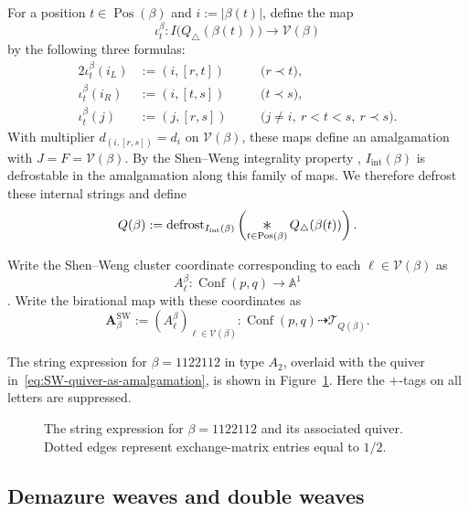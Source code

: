 \documentclass[10pt,a4paper]{article}
\theoremstyle{definition}
\theoremstyle{remark}
\newcommand{\Conf}{\operatorname{Conf}}
\newcommand{\Tcal}{\mathcal T}
\newcommand{\Vcal}{\mathcal V}
\newcommand{\bigast}{\mathop{\vcenter{\hbox{\Large\(\ast\)}}}\displaylimits}
\begin{document}
For a position \(t\in\operatorname{Pos}(\beta)\) and \(i:=|\beta(t)|\), define
the map
\[
 \iota_t^\beta:
 I\bigl(Q_\triangle(\beta(t))\bigr)
 \longrightarrow\Vcal(\beta)
\]
by the following three formulas:
\begin{alignat}{2}
 \iota_t^\beta(i_L)
 &:=(i,[r,t])
 &\quad&\bigl(r\mathrel{\prec}t\bigr),
 \label{eq:SW-basic-map-left}\\
 \iota_t^\beta(i_R)
 &:=(i,[t,s])
 &\quad&\bigl(t\mathrel{\prec}s\bigr),
 \label{eq:SW-basic-map-right}\\
 \iota_t^\beta(j)
 &:=(j,[r,s])
 &\quad&\bigl(j\ne i,\ r<t<s,\ r\mathrel{\prec}s\bigr).
 \label{eq:SW-basic-map-crossing}
\end{alignat}
With multiplier \(d_{(i,[r,s])}=d_i\) on \(\Vcal(\beta)\), these maps define
an amalgamation with \(J=F=\Vcal(\beta)\).
By the Shen--Weng integrality property
\cite[Remark~3.6]{ShenWeng2021}, \(I_{\mathrm{int}}(\beta)\) is defrostable in
the amalgamation along this family of maps.  We therefore defrost these
internal strings and define
\begin{equation}
 Q(\beta)
 :=
 \operatorname{defrost}_{I_{\mathrm{int}}(\beta)}
 \left(
  \bigast_{t\in\operatorname{Pos}(\beta)}
  Q_\triangle(\beta(t))
 \right).
 \label{eq:SW-quiver-as-amalgamation}
\end{equation}

Write the Shen--Weng cluster coordinate corresponding to each
\(\ell\in\Vcal(\beta)\) as
\[
 A_\ell^\beta:\Conf(p,q)\longrightarrow\mathbb A^1
\]
\cite[Definition~3.20]{ShenWeng2021}.  Write the
birational map with these coordinates as
\[
 \mathbf A_\beta^{\mathrm{SW}}
 :=(A_\ell^\beta)_{\ell\in\Vcal(\beta)}:
 \Conf(p,q)\dashrightarrow\Tcal_{Q(\beta)}.
\]

The string expression for \(\beta=1122112\) in type \(A_2\), overlaid with the
quiver in~\eqref{eq:SW-quiver-as-amalgamation}, is shown in
Figure~\ref{fig:SW-1122112-string-quiver}.  Here the \(+\)-tags on all letters
are suppressed.
\begin{figure}[htbp]
\centering

\caption{The string expression for \(\beta=1122112\) and its associated quiver.
Dotted edges represent exchange-matrix entries equal to \(1/2\).}
\label{fig:SW-1122112-string-quiver}
\end{figure}

\subsection{Demazure weaves and double weaves}
\label{subsec:demazure-double-weave}
\end{document}
